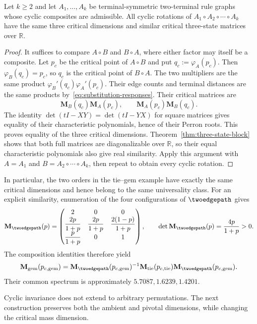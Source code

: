 \begin{lemma}\label{lem:transposition-invariance}
Let $k\ge2$ and let $A_1,\ldots,A_k$ be terminal-symmetric two-terminal rule graphs whose cyclic composites are admissible.
All cyclic rotations of $A_1\circ A_2\circ\cdots\circ A_k$ have the same three critical dimensions and similar critical three-state matrices over $\mathbb R$.
\end{lemma}
\begin{proof}
It suffices to compare $A\circ B$ and $B\circ A$, where either factor may itself be a composite.
Let $p_c$ be the critical point of $A\circ B$ and put $q_c:=\varphi_A(p_c)$.
Then $\varphi_B(q_c)=p_c$, so $q_c$ is the critical point of $B\circ A$.
The two multipliers are the same product $\varphi_B'(q_c)\varphi_A'(p_c)$.
Their edge counts and terminal distances are the same products by~\eqref{eq:substitution-responses}.
Their critical matrices are
\[
 \mathbf M_B(q_c)\mathbf M_A(p_c),\qquad
 \mathbf M_A(p_c)\mathbf M_B(q_c).
\]
The identity $\det(tI-XY)=\det(tI-YX)$ for square matrices gives equality of their characteristic polynomials, hence of their Perron roots.
This proves equality of the three critical dimensions.
Theorem~\ref{thm:three-state-block} shows that both full matrices are diagonalizable over $\mathbb R$, so their equal characteristic polynomials also give real similarity.
Apply this argument with $A=A_1$ and $B=A_2\circ\cdots\circ A_k$, then repeat to obtain every cyclic rotation.
\end{proof}

In particular, the two orders in the tie--gem example have exactly the same critical dimensions and hence belong to the same universality class.
For an explicit similarity, enumeration of the four configurations of $\twoedgepath$ gives
\[
 \mathbf M_{\twoedgepath}(p)=
 \begin{pmatrix}
 2&0&0\\
 \dfrac{2p}{1+p}&\dfrac{2p}{1+p}&\dfrac{2(1-p)}{1+p}\\[3pt]
 \dfrac{p}{1+p}&0&1
 \end{pmatrix},
 \qquad \det\mathbf M_{\twoedgepath}(p)=\frac{4p}{1+p}>0.
\]
The composition identities therefore yield
\[
 \mathbf M_{\mathrm{gem}}(p_{c,\mathrm{gem}})
 =\mathbf M_{\twoedgepath}(p_{c,\mathrm{gem}})^{-1}
 \mathbf M_{\mathrm{tie}}(p_{c,\mathrm{tie}})
 \mathbf M_{\twoedgepath}(p_{c,\mathrm{gem}}).
\]
Their common spectrum is approximately $5.7087,1.6239,1.4201$.

Cyclic invariance does not extend to arbitrary permutations.
The next construction preserves both the ambient and pivotal dimensions, while changing the critical mass dimension.

